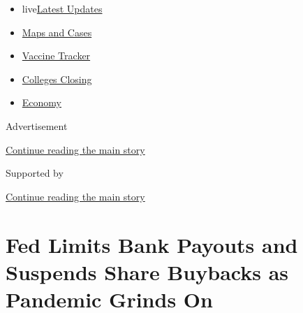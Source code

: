 \begin{itemize}
\tightlist
\item
  live\href{https://www.nytimes3xbfgragh.onion/2020/08/20/world/coronavirus-covid.html?name=styln-coronavirus-markets\&region=TOP_BANNER\&variant=undefined\&block=storyline_menu_recirc\&action=click\&pgtype=Article\&impression_id=fd8f52a1-e387-11ea-bb43-632ae03b21d4}{Latest
  Updates}
\item
  \href{https://www.nytimes3xbfgragh.onion/interactive/2020/us/coronavirus-us-cases.html?name=styln-coronavirus-markets\&region=TOP_BANNER\&variant=undefined\&block=storyline_menu_recirc\&action=click\&pgtype=Article\&impression_id=fd960960-e387-11ea-bb43-632ae03b21d4}{Maps
  and Cases}
\item
  \href{https://www.nytimes3xbfgragh.onion/interactive/2020/science/coronavirus-vaccine-tracker.html?name=styln-coronavirus-markets\&region=TOP_BANNER\&variant=undefined\&block=storyline_menu_recirc\&action=click\&pgtype=Article\&impression_id=fd960961-e387-11ea-bb43-632ae03b21d4}{Vaccine
  Tracker}
\item
  \href{https://www.nytimes3xbfgragh.onion/2020/08/19/us/colleges-closing-covid.html?name=styln-coronavirus-markets\&region=TOP_BANNER\&variant=undefined\&block=storyline_menu_recirc\&action=click\&pgtype=Article\&impression_id=fd960962-e387-11ea-bb43-632ae03b21d4}{Colleges
  Closing}
\item
  \href{https://www.nytimes3xbfgragh.onion/live/2020/08/20/business/stock-market-today-coronavirus?name=styln-coronavirus-markets\&region=TOP_BANNER\&variant=undefined\&block=storyline_menu_recirc\&action=click\&pgtype=Article\&impression_id=fd960963-e387-11ea-bb43-632ae03b21d4}{Economy}
\end{itemize}

Advertisement

\protect\hyperlink{after-top}{Continue reading the main story}

Supported by

\protect\hyperlink{after-sponsor}{Continue reading the main story}

\hypertarget{fed-limits-bank-payouts-and-suspends-share-buybacks-as-pandemic-grinds-on}{%
\section{Fed Limits Bank Payouts and Suspends Share Buybacks as Pandemic
Grinds
On}\label{fed-limits-bank-payouts-and-suspends-share-buybacks-as-pandemic-grinds-on}}

